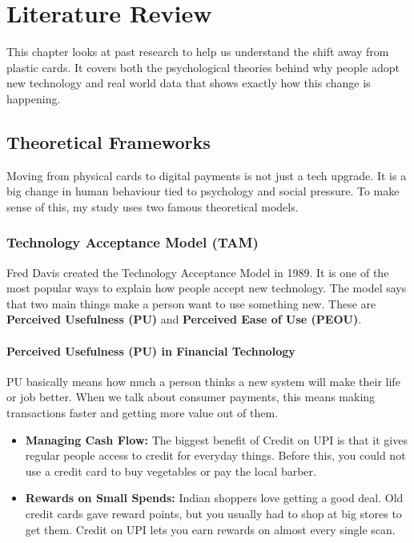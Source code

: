 \chapter{Literature Review}

This chapter looks at past research to help us understand the shift away from plastic cards. It covers both the psychological theories behind why people adopt new technology and real world data that shows exactly how this change is happening.

\section{Theoretical Frameworks}

Moving from physical cards to digital payments is not just a tech upgrade. It is a big change in human behaviour tied to psychology and social pressure. To make sense of this, my study uses two famous theoretical models.

\subsection{Technology Acceptance Model (TAM)}

Fred Davis created the Technology Acceptance Model in 1989. It is one of the most popular ways to explain how people accept new technology. The model says that two main things make a person want to use something new. These are \textbf{Perceived Usefulness (PU)} and \textbf{Perceived Ease of Use (PEOU)}.

\subsubsection{Perceived Usefulness (PU) in Financial Technology}

PU basically means how much a person thinks a new system will make their life or job better. When we talk about consumer payments, this means making transactions faster and getting more value out of them.

\begin{itemize}
    \item \textbf{Managing Cash Flow:} The biggest benefit of Credit on UPI is that it gives regular people access to credit for everyday things. Before this, you could not use a credit card to buy vegetables or pay the local barber.
    \item \textbf{Rewards on Small Spends:} Indian shoppers love getting a good deal. Old credit cards gave reward points, but you usually had to shop at big stores to get them. Credit on UPI lets you earn rewards on almost every single scan.
\end{itemize}


